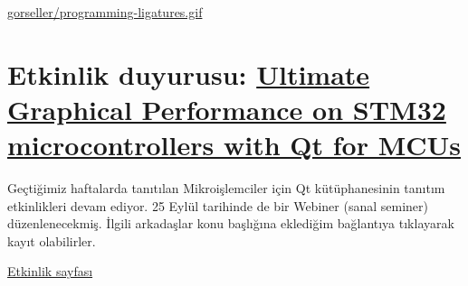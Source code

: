 \documentclass[11pt]{article}
\begin{document}
\url{gorseller/programming-ligatures.gif}
\section{Etkinlik duyurusu: \href{https://www.qt.io/events/ultimate-graphical-performance-on-stm32-microcontrollers-with-qt-for-mcus-1568631867}{Ultimate Graphical Performance on STM32 microcontrollers with Qt for MCUs}}
\label{sec:orge51111b}
Geçtiğimiz haftalarda tanıtılan Mikroişlemciler için Qt kütüphanesinin tanıtım
etkinlikleri devam ediyor. 25 Eylül tarihinde de bir Webiner (sanal seminer)
düzenlenecekmiş. İlgili arkadaşlar konu başlığına eklediğim bağlantıya
tıklayarak kayıt olabilirler.

\href{https://www.qt.io/events/ultimate-graphical-performance-on-stm32-microcontrollers-with-qt-for-mcus-1568631867}{Etkinlik sayfası}
\end{document}
